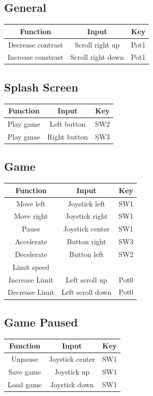 \documentclass{article}
\begin{document}
\subsection*{General}
\begin{center}
\begin{tabular}{ c c c }
Function 	& Input 		& Key \\ \hline
Decrease contrast	& Scroll right up 	& Pot1	\\
Increase constrast 	& Scroll right down	& Pot1	\\
\end{tabular}
\end{center}

\subsection*{Splash Screen}
\begin{center}
\begin{tabular}{ c c c }
 Function 	& Input 		& Key \\ \hline
 Play game 	& Left button 	& SW2 \\  
 Play gmae 	& Right button 	& SW3    
\end{tabular}
\end{center}

\subsection*{Game}
\begin{center}
\begin{tabular}{ c c c }
 Function 	& Input 		& Key \\ \hline
 Move left	& Joystick left	& SW1	\\
 Move right	& Joystick right	& SW1	\\
 Pause	& Joystick center 	& SW1	\\
 Accelerate	& Button right	& SW3	\\ 
 Decelerate	& Button left		& SW2	\\
 Limit speed	&			&		\\
 Increase Limit & Left scroll up 	& Pot0	\\
 Decrease Limit & Left scroll down & Pot0
\end{tabular}
\end{center}

\subsection*{Game Paused}
\begin{center}
\begin{tabular}{ c c c }
Function 	& Input 		& Key \\ \hline
Unpause	& Joystick center 	& SW1	\\
Save game	& Joystick up 	& SW1	\\
Load game 	& Joystick down	& SW1	\\
\end{tabular}
\end{center}
\end{document}
